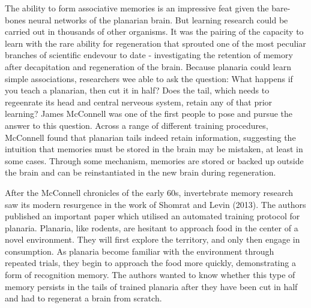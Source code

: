 \documentclass[
  letterpaper,
  DIV=11,
  numbers=noendperiod,
  oneside]{scrartcl}
\begin{document}
The ability to form associative memories is an impressive feat given the
bare-bones neural networks of the planarian brain. But learning research
could be carried out in thousands of other organisms. It was the pairing
of the capacity to learn with the rare ability for regeneration that
sprouted one of the most peculiar branches of scientific endevour to
date - investigating the retention of memory after decapitation and
regeneration of the brain. Because planaria could learn simple
associations, researchers wee able to ask the question: What happens if
you teach a planarian, then cut it in half? Does the tail, which needs
to regeenrate its head and central nerveous system, retain any of that
prior learning? James McConnell was one of the first people to pose and
pursue the answer to this question. Across a range of different training
procedures, McConnell found that planarian tails indeed retain
information, suggesting the intuition that memories must be stored in
the brain may be mistaken, at least in some cases. Through some
mechanism, memories are stored or backed up outside the brain and can be
reinstantiated in the new brain during regeneration.

After the McConnell chronicles of the early 60s, invertebrate memory
research saw its modern resurgence in the work of Shomrat and Levin
(2013). The authors published an important paper which utilised an
automated training protocol for planaria. Planaria, like rodents, are
hesitant to approach food in the center of a novel environment. They
will first explore the territory, and only then engage in consumption.
As planaria become familiar with the environment through repeated
trials, they begin to approach the food more quickly, demonstrating a
form of recognition memory. The authors wanted to know whether this type
of memory persists in the tails of trained planaria after they have been
cut in half and had to regenerat a brain from scratch.
\end{document}
